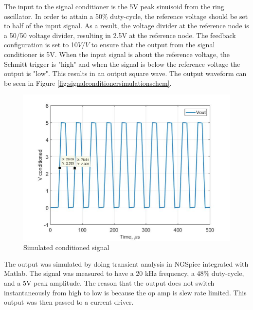 The input to the signal conditioner is the 5V peak sinuisoid from the ring oscillator. In order to attain a 50\% duty-cycle, the reference voltage should be set to half of the input signal. As a result, the voltage divider at the reference node is a 50/50 voltage divider, resulting in 2.5V at the reference node. The feedback configuration is set to 10$V/V$ to ensure that the output from the signal conditioner is 5V. When the input signal is about the reference voltage, the Schmitt trigger is "high" and when the signal is below the reference voltage the output is "low". This results in an output square wave. The output waveform can be seen in Figure \ref{fig:signalconditionersimulationschem}.

\begin{figure}[H]
	\centering
	\includegraphics[width=0.6\linewidth]{CircuitDevelopment/Vconditioned_sim}
	\caption[Simulated conditioned signal]{Simulated conditioned signal}
	\label{fig:vconditionedsim}
\end{figure}

The output was simulated by doing transient analysis in NGSpice integrated with Matlab. The signal was measured to have a 20 kHz frequency, a 48\% duty-cycle, and a 5V peak amplitude. The reason that the output does not switch instantaneously from high to low is because the op amp is slew rate limited. This output was then passed to a current driver.


